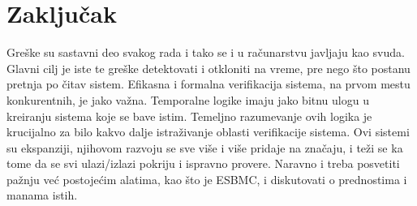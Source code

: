 \documentclass[a4paper]{article}
\begin{document}
	\section{Zaključak}
	\label{sec:zakljucak}

Greške su sastavni deo svakog rada i tako se i u računarstvu javljaju kao svuda. Glavni cilj je iste te greške detektovati i otkloniti na vreme, pre nego što postanu pretnja po čitav sistem. Efikasna i formalna verifikacija sistema, na prvom mestu konkurentnih, je jako važna. Temporalne logike imaju jako bitnu ulogu u kreiranju sistema koje se bave istim. Temeljno razumevanje ovih logika je krucijalno za bilo kakvo dalje istraživanje oblasti verifikacije sistema. Ovi sistemi su ekspanziji, njihovom razvoju se sve više i više pridaje na značaju, i teži se ka tome da se svi ulazi/izlazi pokriju i ispravno provere. Naravno i treba posvetiti pažnju već postojećim alatima, kao što je ESBMC, i diskutovati o prednostima i manama istih.


	\appendix
	 
	


	
\end{document}

